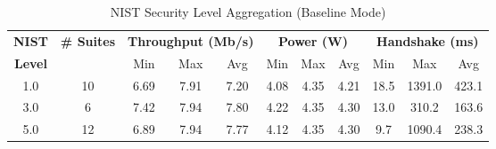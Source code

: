 \begin{table}[htbp]
\centering
\caption{NIST Security Level Aggregation (Baseline Mode)}
\label{tab:nist_level_agg}
\begin{tabular}{@{}ccccccccccc@{}}
\toprule
\textbf{NIST} & \textbf{\# Suites} & \multicolumn{3}{c}{\textbf{Throughput (Mb/s)}} & \multicolumn{3}{c}{\textbf{Power (W)}} & \multicolumn{3}{c}{\textbf{Handshake (ms)}} \\
\textbf{Level} &  & Min & Max & Avg & Min & Max & Avg & Min & Max & Avg \\
\midrule
1.0 & 10 & 6.69 & 7.91 & 7.20 & 4.08 & 4.35 & 4.21 & 18.5 & 1391.0 & 423.1 \\
3.0 & 6 & 7.42 & 7.94 & 7.80 & 4.22 & 4.35 & 4.30 & 13.0 & 310.2 & 163.6 \\
5.0 & 12 & 6.89 & 7.94 & 7.77 & 4.12 & 4.35 & 4.30 & 9.7 & 1090.4 & 238.3 \\
\bottomrule
\end{tabular}
\end{table}
